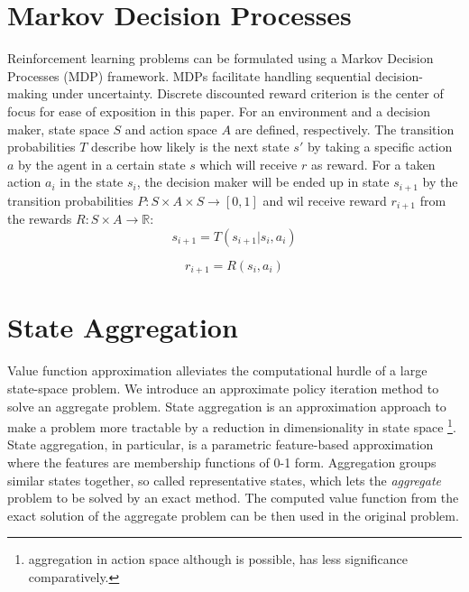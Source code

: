 \documentclass{article}
\begin{document}
    \section{Markov Decision Processes}
    Reinforcement learning problems can be formulated using a Markov Decision Processes (MDP)
    framework\cite{Puterman1994, Bertsekas}.
    MDPs facilitate handling sequential decision-making under uncertainty.
    Discrete discounted reward criterion is the center of focus for ease of exposition in this paper.
    For an environment and a decision maker, state space $S$ and action space $A$ are defined, respectively.
    The transition probabilities $T$ describe how likely is the next state $s'$ by taking a specific action $a$ by
    the agent in a certain state $s$ which will receive $r$ as reward.
    For a taken action $a_i$ in the state $s_i$, the decision maker will be ended up in state $s_{i+1}$ by the
    transition probabilities $P : S \times A \times S \rightarrow [0, 1]$ and wil receive reward $r_{i+1}$ from the
    rewards $R : S \times A \rightarrow \mathbb{R}$: \\
    \begin{equation}
        s_{i+1} = T(s_{i+1}|s_i, a_i)
    \end{equation}

    \begin{equation}
        r_{i+1} = R(s_i, a_i)
    \end{equation}


    \section{State Aggregation}
    Value function approximation alleviates the computational hurdle of a large state-space problem.
    We introduce an approximate policy iteration method to solve an aggregate problem.
    State aggregation is an approximation approach to make a problem more tractable by a reduction in dimensionality in
    state space \footnote{aggregation in action space although is possible, has less significance comparatively.}.
    State aggregation, in particular, is a parametric feature-based approximation where the features are membership
    functions of 0-1 form.
    Aggregation groups similar states together, so called representative states, which lets the \textit{aggregate}
    problem to be solved by an exact method.
    The computed value function from the exact solution of the aggregate problem can be then used in the original
    problem.
\end{document}
